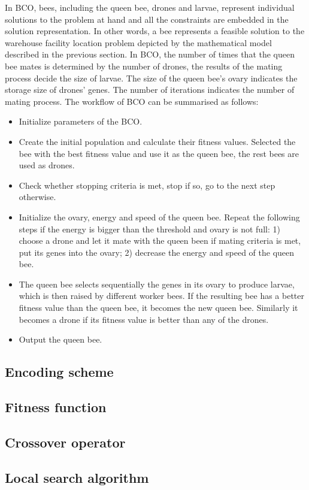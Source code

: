 In BCO, bees, including the queen bee, drones and larvae, represent individual solutions to the problem at hand and all the constraints are embedded in the solution representation.
In other words, a bee represents a feasible solution to the warehouse facility location problem depicted by the mathematical model described in the previous section.
In BCO, the number of times that the queen bee mates is determined by the number of drones, the results of the mating process decide the size of larvae.
The size of the queen bee's ovary indicates the storage size of drones' genes.
The number of iterations indicates the number of mating process.
The workflow of BCO can be summarised as follows:
\begin{itemize}
	\item Initialize parameters of the BCO.
	\item Create the initial population and calculate their fitness values. Selected the bee with the best fitness value and use it as the queen bee, the rest bees are used as drones.
	\item Check whether stopping criteria is met, stop if so, go to the next step otherwise.
	\item Initialize the ovary, energy and speed of the queen bee. 
	Repeat the following steps if the energy is bigger than the threshold and ovary is not full: 1) choose a drone and let it mate with the queen been if mating criteria is met, put its genes into the ovary; 2) decrease the energy and speed of the queen bee.
	\item The queen bee selects sequentially the genes in its ovary to produce larvae, which is then raised by different worker bees. If the resulting bee has a better fitness value than the queen bee, it becomes the new queen bee. Similarly it becomes a drone if its fitness value is better than any of the drones.
	\item Output the queen bee.
\end{itemize}



\subsection{Encoding scheme}


\subsection{Fitness function}


\subsection{Crossover operator}




\subsection{Local search algorithm}




